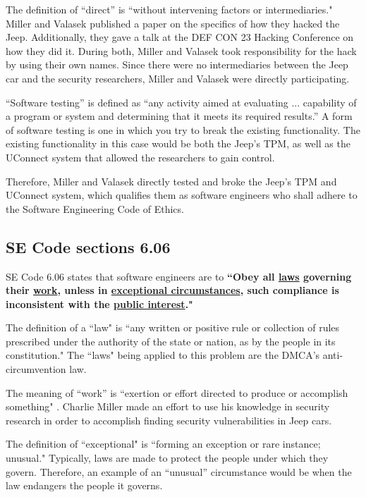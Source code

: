 \documentclass[12pt]{article}
\begin{document}
\begin{multicols}{2}
The definition of ``direct'' is ``without intervening factors or intermediaries."\cite{dictionary}
Miller and Valasek published a paper on the specifics of how they hacked the Jeep. \cite{officialPaper} Additionally, they gave a talk at the DEF CON 23 Hacking Conference on how they did it. \cite{youtube} During both, Miller and Valasek took responsibility for the hack by using their own names.\cite{officialPaper}\cite{youtube} Since there were no intermediaries between the Jeep car and the security researchers, Miller and Valasek were directly participating. 

``Software testing'' is defined as ``any activity aimed at evaluating ... capability of a program or system and determining that it meets its required results.''\cite{softwareTesting} A form of software testing is one in which you try to break the existing functionality. \cite{softwareTesting}\cite{breakTests} The existing functionality in this case would be both the Jeep's TPM, as well as the UConnect system that allowed the researchers to gain control. 

Therefore, Miller and Valasek directly tested and broke the Jeep's TPM and UConnect system, which qualifies them as software engineers who shall adhere to the Software Engineering Code of Ethics.

\subsection{SE Code sections 6.06}
SE Code 6.06 states that software engineers are to \textbf{``Obey all \underline{laws} governing their \underline{work}, unless in \underline{exceptional circumstances}, such compliance is inconsistent with the \underline{public interest}."} \cite{seCode}

The definition of a ``law" is ``any written or positive rule or collection of rules prescribed under the authority of the state or nation, as by the people in its constitution."\cite{dictionary} The ``laws" being applied to this problem are the DMCA's anti-circumvention law. 

The meaning of ``work'' is ``exertion or effort directed to produce or accomplish something" \cite{dictionary}. Charlie Miller made an effort to use his knowledge in security research in order to accomplish finding security vulnerabilities in Jeep cars.\cite{officialPaper}

The definition of ``exceptional" is ``forming an exception or rare instance; unusual." \cite{dictionary} Typically, laws are made to protect the people under which they govern. Therefore, an example of an ``unusual'' circumstance would be when the law endangers the people it governs.


\end{multicols}
\end{document}
